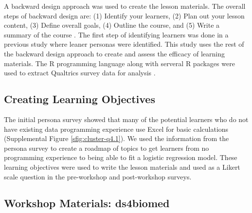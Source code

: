 \documentclass[030-workshop.tex]{subfiles}
\begin{document}
  A backward design approach was used to create the lesson materials.
  The overall steps of backward design are:
  (1) Identify your learners,
  (2) Plan out your lesson content,
  (3) Define overall goals,
  (4) Outline the course, and
  (5) Write a summary of the course
  \cite{wilson2019teaching}.
  The first step of identifying learners was done in a previous study where leaner personas were identified.
  This study uses the rest of the backward design approach to create and assess the efficacy of learning materials.
  The R programming language
  \cite{rcoreteamLanguageEnvironmentStatistical2021}
  along with serveral R packages were used to extract Qualtrics survey data for analysis
  \cite{bacheMagrittrForwardpipeOperator2020a,
  chenVennDiagramGenerateHighresolution2021, corrplot2021,
  dahlXtableExportTables2019a, firkeJanitorSimpleTools2021a,
  garnierViridisColorblindfriendlyColor2021a,
  ginnQualtRicsDownloadQualtrics2021b, grolemundDatesTimesMade2011a,
  henryPurrrFunctionalProgramming2020a, henryRlangFunctionsBase2021a,
  hesterFsCrossplatformFile2021a, hesterGlueInterpretedString2021a,
  kohlMKpowerPowerAnalysis2020, mullerHereSimplerWay2020a,
  mullerTibbleSimpleData2021a, neuwirthRColorBrewerColorBrewerPalettes2014a,
  oomsJsonlitePackagePractical2014a, oomsWritexlExportData2021a,
  robinsonBroomConvertStatistical2021, wickhamDplyrGrammarData2021a,
  wickhamForcatsToolsWorking2021a, wickhamGgplot2ElegantGraphics2016a,
  wickhamReadrReadRectangular2021a, wickhamRvestEasilyHarvest2021a,
  wickhamStringrSimpleConsistent2019a, wickhamTidyrTidyMessy2021a,
  wickhamWelcomeTidyverse2019b, Qualtrics2005}.

  \subsection{Creating Learning Objectives}

    The initial persona survey showed that many of the potential learners who do not
    have existing data programming experience use Excel for basic calculations
    (Supplemental Figure \ref{sfig:cluster-q4.1}).
    We used the information from the persona survey to create a roadmap of topics
    to get learners from no programming experience to being able to fit a logistic regression model.
    These learning objectives were used to write the lesson materials
    and used as a Likert scale question in the pre-workshop and post-workshop surveys.

  \subsection{Workshop Materials: ds4biomed}
\end{document}
